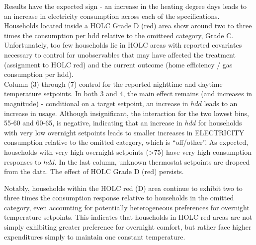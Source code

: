 \documentclass[
]{article}
\begin{document}
Results have the expected sign - an increase in the heating degree days leads to an increase in electricity consumption across each of the specifications.
Households located inside a HOLC Grade D (red) area show around two to three times the consumption per hdd relative to the omitteed category, Grade C.
Unfortunately, too few households lie in HOLC areas with reported covariates necessary to control
for unobservables that may have affected the treatment (assignment to HOLC red) and the current outcome (home efficiency / gas consumption per hdd).\\
Column (3) through (7) control for the reported nighttime and daytime temperature setpoints. In both 3 and 4, the main effect remains (and increases in magnitude) - conditional on a target setpoint,
an increase in \(hdd\) leads to an increase in usage.
Although insignificant, the interaction for the two lowest bins, 55-60 and 60-65, is negative, indicating that an increase in \(hdd\) for households with very low overnight setpoints
leads to smaller increases in ELECTRICITY consumption relative to the omitted category, which is ``off/other''. As expected, households with very high overnight setpoints (\textgreater75) have very high
consumption responses to \(hdd\). In the last column, unknown thermostat setpoints are dropeed from the data. The effect of HOLC Grade D (red) persists.

Notably, households within the HOLC red (D) area continue to exhibit two to three times the consumption response relative to households in the omitted category, even accounting for
potentially heterogeneous preferences for overnight temperature setpoints. This indicates that households in HOLC red areas are not simply exhibiting greater preference
for overnight comfort, but rather face higher expenditures simply to maintain one constant temperature.
\end{document}
